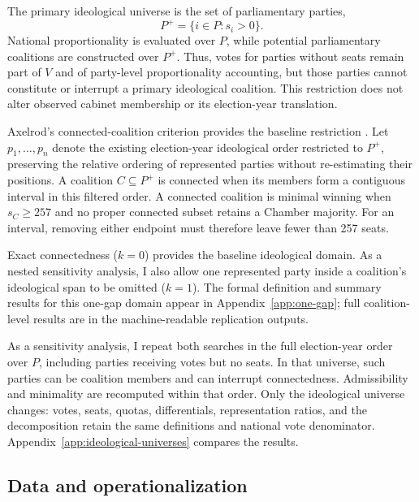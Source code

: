 \documentclass[11pt]{article}
\begin{document}
The primary ideological universe is the set of parliamentary parties,
\[
P^+=\{i\in P:s_i>0\}.
\]
National proportionality is evaluated over \(P\), while potential parliamentary
coalitions are constructed over \(P^+\). Thus, votes for parties without seats
remain part of \(V\) and of party-level proportionality accounting, but those
parties cannot constitute or interrupt a primary ideological coalition. This
restriction does not alter observed cabinet membership or its election-year
translation.

Axelrod's connected-coalition criterion provides the baseline restriction
\parencite{axelrod1970conflict}. Let \(p_1,\ldots,p_n\) denote the existing
election-year ideological order restricted to \(P^+\), preserving the relative
ordering of represented parties without re-estimating their positions. A
coalition \(C\subseteq P^+\) is connected when its members form a contiguous
interval in this filtered order. A connected coalition is minimal winning when
\(s_C\geq257\) and no proper connected subset retains a Chamber majority.
For an interval, removing either endpoint must therefore leave fewer than
257 seats.

Exact connectedness (\(k=0\)) provides the baseline ideological domain. As a
nested sensitivity analysis, I also allow one represented party inside a
coalition's ideological span to be omitted (\(k=1\)). The formal definition and
summary results for this one-gap domain appear in Appendix~\ref{app:one-gap};
full coalition-level results are in the machine-readable replication outputs.

As a sensitivity analysis, I repeat both searches in the full election-year
order over \(P\), including parties receiving votes but no seats. In that
universe, such parties can be coalition members and can interrupt connectedness.
Admissibility and minimality are recomputed within that order. Only the
ideological universe changes: votes, seats, quotas, differentials, representation
ratios, and the decomposition retain the same definitions and national vote
denominator. Appendix~\ref{app:ideological-universes} compares the results.


\subsection{Data and operationalization}
\label{sec:data}
\end{document}
